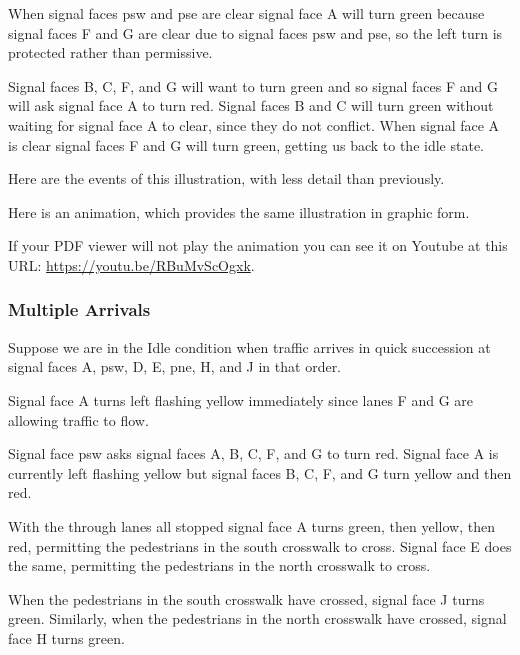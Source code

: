 \documentclass[letterpaper,twoside]{article}
\begin{document}
When signal faces psw and pse are clear signal face A will turn green because
signal faces F and G are clear due to signal faces psw and pse,
so the left turn is protected rather than permissive.

Signal faces B, C, F, and G will want to turn green and so signal faces
F and G will ask signal face A to turn red.  Signal faces B and C
will turn green without waiting for signal face A to clear, since
they do not conflict.  When signal face A is clear signal faces
F and G will turn green, getting us back to the idle state.

Here are the events of this illustration, with less detail than
previously.



Here is an animation, which provides the same illustration in graphic form.

\noindent{}

If your PDF viewer will not play the animation you can see it on Youtube
at this URL:
\href{https://youtu.be/RBuMvScOgxk}{https://youtu.be/RBuMvScOgxk}.

\subsubsection{Multiple Arrivals}

Suppose we are in the Idle condition when traffic arrives in quick succession
at signal faces A, psw, D, E, pne, H, and J in that order.

Signal face A turns left flashing yellow immediately since lanes
F and G are allowing traffic to flow.

Signal face psw asks signal faces A, B, C, F, and G to turn red.
Signal face A is currently left flashing yellow but signal faces
B, C, F, and G turn yellow and then red.

With the through lanes all stopped signal face A turns
green, then yellow, then red, permitting the pedestrians in the south
crosswalk to cross.  Signal face E does the same, permitting the
pedestrians in the north crosswalk to cross.

When the pedestrians in the south crosswalk have crossed, signal
face J turns green.  Similarly, when the pedestrians in the
north crosswalk have crossed, signal face H turns green.
\end{document}
